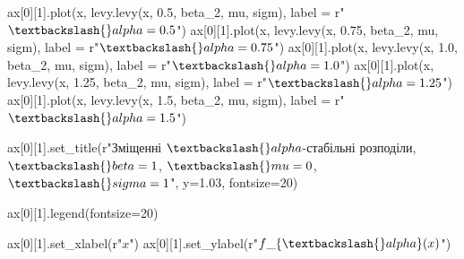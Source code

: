 \documentclass[
  letterpaper,
]{report}
\newenvironment{Shaded}{\begin{snugshade}}{\end{snugshade}}
\newcommand{\DecValTok}[1]{\textcolor[rgb]{0.68,0.00,0.00}{#1}}
\newcommand{\FloatTok}[1]{\textcolor[rgb]{0.68,0.00,0.00}{#1}}
\newcommand{\NormalTok}[1]{\textcolor[rgb]{0.00,0.23,0.31}{#1}}
\newcommand{\OperatorTok}[1]{\textcolor[rgb]{0.37,0.37,0.37}{#1}}
\newcommand{\VerbatimStringTok}[1]{\textcolor[rgb]{0.13,0.47,0.30}{#1}}
\begin{document}
\begin{Shaded}
\begin{Highlighting}[]
\NormalTok{ax[}\DecValTok{0}\NormalTok{][}\DecValTok{1}\NormalTok{].plot(x, levy.levy(x, }\FloatTok{0.5}\NormalTok{, beta\_2, mu, sigm), label }\OperatorTok{=} \VerbatimStringTok{r"$ \textbackslash{}alpha=0.5 $"}\NormalTok{)}
\NormalTok{ax[}\DecValTok{0}\NormalTok{][}\DecValTok{1}\NormalTok{].plot(x, levy.levy(x, }\FloatTok{0.75}\NormalTok{, beta\_2, mu, sigm), label }\OperatorTok{=} \VerbatimStringTok{r"$ \textbackslash{}alpha=0.75 $"}\NormalTok{)}
\NormalTok{ax[}\DecValTok{0}\NormalTok{][}\DecValTok{1}\NormalTok{].plot(x, levy.levy(x, }\FloatTok{1.0}\NormalTok{, beta\_2, mu, sigm), label }\OperatorTok{=} \VerbatimStringTok{r"$ \textbackslash{}alpha=1.0 $"}\NormalTok{)}
\NormalTok{ax[}\DecValTok{0}\NormalTok{][}\DecValTok{1}\NormalTok{].plot(x, levy.levy(x, }\FloatTok{1.25}\NormalTok{, beta\_2, mu, sigm), label }\OperatorTok{=} \VerbatimStringTok{r"$ \textbackslash{}alpha=1.25 $"}\NormalTok{)}
\NormalTok{ax[}\DecValTok{0}\NormalTok{][}\DecValTok{1}\NormalTok{].plot(x, levy.levy(x, }\FloatTok{1.5}\NormalTok{, beta\_2, mu, sigm), label }\OperatorTok{=} \VerbatimStringTok{r"$ \textbackslash{}alpha=1.5 $"}\NormalTok{)}

\NormalTok{ax[}\DecValTok{0}\NormalTok{][}\DecValTok{1}\NormalTok{].set\_title(}\VerbatimStringTok{r"Зміщенні $\textbackslash{}alpha${-}стабільні розподіли, $ \textbackslash{}beta = 1 $, $ \textbackslash{}mu = 0 $, $ \textbackslash{}sigma = 1 $"}\NormalTok{, y}\OperatorTok{=}\FloatTok{1.03}\NormalTok{, fontsize}\OperatorTok{=}\DecValTok{20}\NormalTok{)}

\NormalTok{ax[}\DecValTok{0}\NormalTok{][}\DecValTok{1}\NormalTok{].legend(fontsize}\OperatorTok{=}\DecValTok{20}\NormalTok{)}

\NormalTok{ax[}\DecValTok{0}\NormalTok{][}\DecValTok{1}\NormalTok{].set\_xlabel(}\VerbatimStringTok{r"$ x $"}\NormalTok{)}
\NormalTok{ax[}\DecValTok{0}\NormalTok{][}\DecValTok{1}\NormalTok{].set\_ylabel(}\VerbatimStringTok{r"$ f\_\{\textbackslash{}alpha\}(x) $"}\NormalTok{)}



\end{Highlighting}
\end{Shaded}
\end{document}
